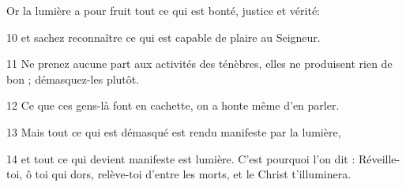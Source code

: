 
Or la lumière a pour fruit tout ce qui est bonté, justice et vérité:

10 et sachez reconnaître ce qui est capable de plaire au Seigneur.

11 Ne prenez aucune part aux activités des ténèbres, elles ne produisent rien de bon ; démasquez-les plutôt.

12 Ce que ces gens-là font en cachette, on a honte même d’en parler.

13 Mais tout ce qui est démasqué est rendu manifeste par la lumière,

14 et tout ce qui devient manifeste est lumière. C’est pourquoi l’on dit : Réveille-toi, ô toi qui dors, relève-toi d’entre les morts, et le Christ t’illuminera.
